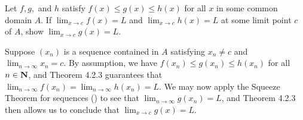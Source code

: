 \documentclass{lew98_solutions}
\begin{document}
\begin{exercise}
\label{ex:4.2.11}
    Let \( f, g, \) and \( h \) satisfy \( f(x) \leq g(x) \leq h(x) \) for all \( x \) in some common domain \( A \). If \( \lim_{x \to c} f(x) = L \) and \( \lim_{x \to c} h(x) = L \) at some limit point \( c \) of \( A \), show \( \lim_{x \to c} g(x) = L \).
\end{exercise}

\begin{solution}
    Suppose \( (x_n) \) is a sequence contained in \( A \) satisfying \( x_n \neq c \) and \( \lim_{n \to \infty} x_n = c \). By assumption, we have \( f(x_n) \leq g(x_n) \leq h(x_n) \) for all \( n \in \mathbf{N} \), and Theorem 4.2.3 guarantees that \( \lim_{n \to \infty} f(x_n) = \lim_{n \to \infty} h(x_n) = L \). We may now apply the Squeeze Theorem for sequences () to see that \( \lim_{n \to \infty} g(x_n) = L \), and Theorem 4.2.3 then allows us to conclude that \( \lim_{x \to c} g(x) = L \).
\end{solution}
\end{document}
